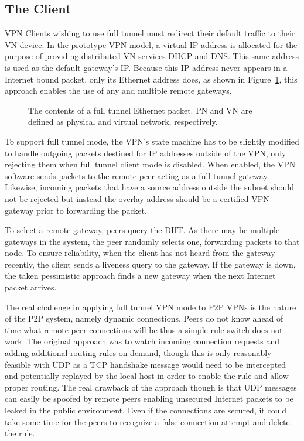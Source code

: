 \subsection{The Client}
VPN Clients wishing to use full tunnel must redirect their default traffic to
their VN device.  In the prototype VPN model, a virtual IP address is allocated
for the purpose of providing distributed VN services DHCP and DNS.  This same
address is used as the default gateway's IP.  Because this IP address never
appears in a Internet bound packet, only its Ethernet address does, as shown in
Figure~\ref{fig:tunnel_packet}, this approach enables the use of any and
multiple remote gateways.

\begin{figure}
\centering
{}
\caption[The contents of a full tunnel Ethernet packet]{The contents of a full
tunnel Ethernet packet.  PN and VN are defined as physical and virtual network,
respectively.}
\label{fig:tunnel_packet}
\end{figure}

To support full tunnel mode, the VPN's state machine has to be slightly modified
to handle outgoing packets destined for IP addresses outside of the VPN, only
rejecting them when full tunnel client mode is disabled.  When enabled, the VPN
software sends packets to the remote peer acting as a full tunnel gateway.
Likewise, incoming packets that have a source address outside the subnet should
not be rejected but instead the overlay address should be a certified VPN
gateway prior to forwarding the packet.

To select a remote gateway, peers query the DHT.  As there may be multiple
gateways in the system, the peer randomly selects one, forwarding packets to
that node.  To ensure reliability, when the client has not heard from the
gateway recently, the client sends a liveness query to the gateway.  If the
gateway is down, the taken pessimistic approach finds a new gateway when
the next Internet packet arrives.

The real challenge in applying full tunnel VPN mode to P2P VPNs is the nature
of the P2P system, namely dynamic connections.  Peers do not know ahead of time
what remote peer connections will be thus a simple rule switch does not work.
The original approach was to watch incoming connection requests and adding
additional routing rules on demand, though this is only reasonably feasible
with UDP as a TCP handshake message would need to be intercepted and potentially
replayed by the local host in order to enable the rule and allow proper routing.
The real drawback of the approach though is that UDP messages can easily be
spoofed by remote peers enabling unsecured Internet packets to be leaked in the
public environment.  Even if the connections are secured, it could take some
time for the peers to recognize a false connection attempt and delete the rule.


